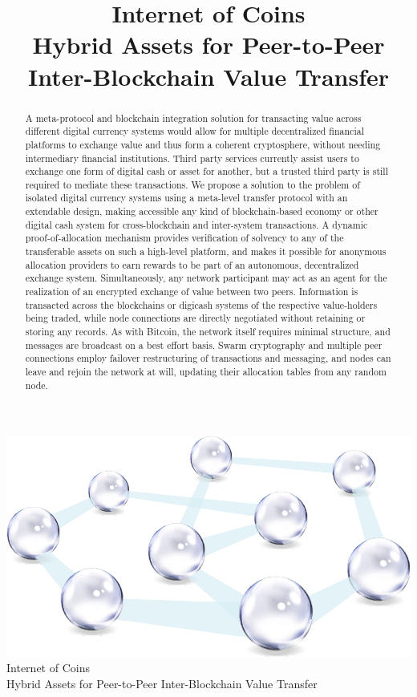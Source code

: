 \documentclass[11pt, a4paper]{article}
\title{Internet of Coins\\[6mm]
\small{Hybrid Assets for Peer-to-Peer Inter-Blockchain Value Transfer}
}
\begin{document}
\begin{center}
\includegraphics[width=.5\textwidth]{images/internetofcoins_logo_vectorcolor2.pdf}\\[8ex]
{\Huge Internet of Coins}\\[4ex]
{\Large Hybrid Assets for Peer-to-Peer Inter-Blockchain Value
Transfer}\\[4ex]
\end{center}

\begin{abstract}
 A meta-protocol and blockchain integration solution for transacting value across different digital currency systems would allow for multiple decentralized financial platforms to exchange value and thus form a coherent cryptosphere, without needing intermediary financial institutions. Third party services currently assist users to exchange one form of digital cash or asset for another, but a trusted third party is still required to mediate these transactions. We propose a solution to the problem of isolated digital currency systems using a meta-level transfer protocol with an extendable design, making accessible any kind of blockchain-based economy or other digital cash system for cross-blockchain and inter-system transactions. A dynamic proof-of-allocation mechanism provides verification of solvency to any of the transferable assets on such a high-level platform, and makes it possible for anonymous allocation providers to earn rewards to be part of an autonomous, decentralized exchange system. Simultaneously, any network participant may act as an agent for the realization of an encrypted exchange of value between two peers. Information is transacted across the blockchains or digicash systems of the respective value-holders being traded, while node connections are directly negotiated without retaining or storing any records. As with Bitcoin, the network itself requires minimal structure, and messages are broadcast on a best effort basis. Swarm cryptography and multiple peer connections employ failover restructuring of transactions and messaging, and nodes can leave and rejoin the network at will, updating their allocation tables from any random node.
\end{abstract}
\end{document}
